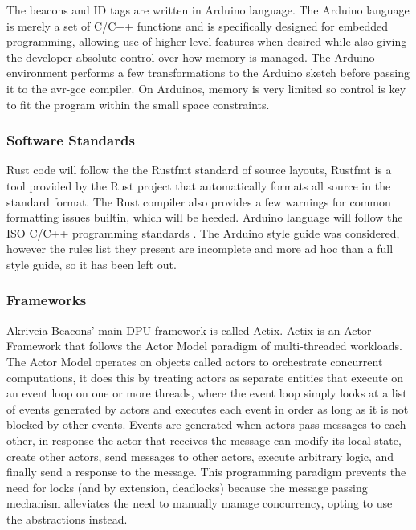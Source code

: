 \bigskip
The beacons and ID tags are written in Arduino language.
The Arduino language is merely a set of C/C++ functions and is specifically designed for embedded programming, allowing use of higher level features when desired while also giving the developer absolute control over how memory is managed.
The Arduino environment performs a few transformations to the Arduino sketch before passing it to the avr-gcc compiler.
On Arduinos, memory is very limited so control is key to fit the program within the small space constraints.


\medskip
\subsubsection{Software Standards}
\medskip
Rust code will follow the the Rustfmt standard of source layouts, Rustfmt is a tool provided by the Rust project that automatically formats all source in the standard format.
The Rust compiler also provides a few warnings for common formatting issues builtin, which will be heeded.
Arduino language will follow the ISO C/C++ programming standards \cite{cpp_core_guidelines}.
The Arduino style guide \cite{arduino_style_guide} was considered, however the rules list they present are incomplete and more ad hoc than a full style guide, so it has been left out.

\medskip
\subsubsection{Frameworks}
\medskip
Akriveia Beacons' main DPU framework is called \Gls{Actix}.
Actix is an \Gls{Actor} Framework that follows the \Gls{Actor Model} paradigm of multi-threaded workloads.
The Actor Model operates on objects called actors to orchestrate concurrent computations, it does this by treating actors as separate entities that execute on an event loop on one or more threads, where the event loop simply looks at a list of events generated by actors and executes each event in order as long as it is not blocked by other events.
Events are generated when actors pass messages to each other, in response the actor that receives the message can modify its local state, create other actors, send messages to other actors, execute arbitrary logic, and finally send a response to the message.
This programming paradigm prevents the need for locks (and by extension, deadlocks) because the message passing mechanism alleviates the need to manually manage concurrency, opting to use the abstractions instead.

